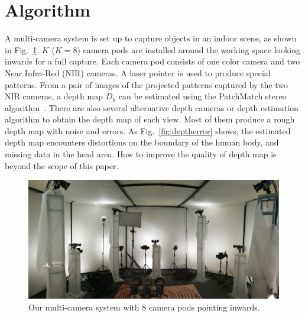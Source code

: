 \section{Algorithm}
\label{sec:overview}

A multi-camera system is set up to capture objects in an indoor scene, as shown in Fig.~\ref{fig:rig}.
%
$K$ ($K=8$) camera pods are installed around the working space looking inwards for a full capture.
Each camera pod consists of one color camera and two Near Infra-Red (NIR) cameras. A laser pointer is used to produce special patterns.
From a pair of images of the projected patterns captured by the two NIR cameras, a depth map $D_k$ can be estimated using the PatchMatch stereo algorithm~\cite{Bleyer2011PatchMatch}.
There are also several alternative depth cameras or depth estimation algorithm to obtain the depth map of each view. Most of them produce a rough depth map with noise and errors.
As Fig.~\ref{fig:deptherror} shows, the estimated depth map encounters distortions on the boundary of the human body, and missing data in the head area.
How to improve the quality of depth map is beyond the scope of this paper.

\begin{figure}
	\centering
	\includegraphics[width=\columnwidth]{image/rig.jpg}
	\caption{Our multi-camera system with 8 camera pods pointing inwards.}
	\label{fig:rig}
\end{figure}



